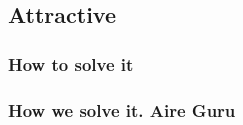 \subsection{Attractive}
 

\subsubsection{How to solve it} 


\subsubsection{How we solve it. Aire Guru} 
 
\begin{itemize}
    \done
    \crossed
    
\end{itemize}
\newpage